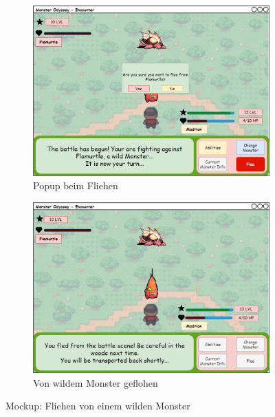 \begin{figure}[H]
    \centering
    \begin{subfigure}[b]{0.4\textwidth}
        \includegraphics[width=\textwidth]{images/mockups/Encounter/EncounterWildFleePopUp.png}
        \caption{Popup beim Fliehen}
        \label{fig: Von wildem Monster fliehen Popup}
    \end{subfigure}
    \hfill
    \begin{subfigure}[b]{0.4\textwidth}
        \includegraphics[width=\textwidth]{images/mockups/Encounter/EncounterWildFleed.png}
        \caption{Von wildem Monster geflohen}
        \label{fig: Von wildem Monster geflohen}
    \end{subfigure}
    \caption{Mockup: Fliehen von einem wilden Monster}
    \label{fig: Fliehen von einem wilden Monster}
\end{figure}

